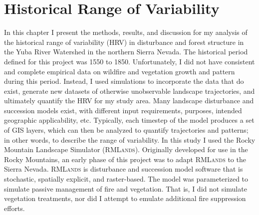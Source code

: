 
\chapter{Historical Range of Variability}
\label{ch:hrv}

In this chapter I present the methods, results, and discussion for my analysis of the historical range of variability (HRV) in disturbance and forest structure in the Yuba River Watershed in the northern Sierra Nevada. The historical period defined for this project was 1550 to 1850. Unfortunately, I did not have consistent and complete empirical data on wildfire and vegetation growth and pattern during this period. Instead, I used simulations to incorporate the data that do exist, generate new datasets of otherwise unobservable landscape trajectories, and ultimately quantify the HRV for my study area. Many landscape disturbance and succession models exist, with different input requirements, purposes, intended geographic applicability, etc. Typically, each timestep of the model produces a set of GIS layers, which can then be analyzed to quantify trajectories and patterns; in other words, to describe the range of variability. In this study I used the Rocky Mountain Landscape Simulator (\textsc{RMLands}). Originally developed for use in the Rocky Mountains, an early phase of this project was to adapt \textsc{RMLands} to the Sierra Nevada. \textsc{RMLands} is disturbance and succession model software that is stochastic, spatially explicit, and raster-based. The model was parameterized to simulate passive management of fire and vegetation. That is, I did not simulate vegetation treatments, nor did I attempt to emulate additional fire suppression efforts.



